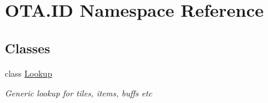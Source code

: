 \hypertarget{namespaceOTA_1_1ID}{}\section{O\+T\+A.\+I\+D Namespace Reference}
\label{namespaceOTA_1_1ID}
\subsection*{Classes}
\begin{DoxyCompactItemize}
\item 
class \hyperlink{classOTA_1_1ID_1_1Lookup}{Lookup}
\begin{DoxyCompactList}\small\item\em Generic lookup for tiles, items, buffs etc \end{DoxyCompactList}\end{DoxyCompactItemize}

